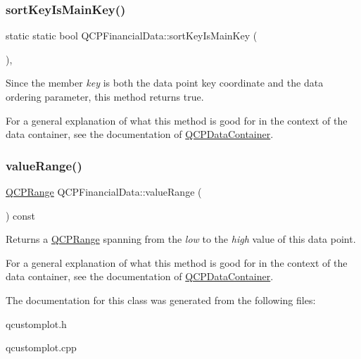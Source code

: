 \subsubsection{\texorpdfstring{sort\+Key\+Is\+Main\+Key()}{sortKeyIsMainKey()}}
{\footnotesize\ttfamily static static bool Q\+C\+P\+Financial\+Data\+::sort\+Key\+Is\+Main\+Key (\begin{DoxyParamCaption}{ }\end{DoxyParamCaption})\hspace{0.3cm}{\ttfamily [inline]}, {\ttfamily [static]}}

Since the member {\itshape key} is both the data point key coordinate and the data ordering parameter, this method returns true.

For a general explanation of what this method is good for in the context of the data container, see the documentation of \hyperlink{classQCPDataContainer}{Q\+C\+P\+Data\+Container}. \mbox{\label{classQCPFinancialData_a164d5584eeeb9ba48b4b595ac2ac7fcf}} 
\subsubsection{\texorpdfstring{value\+Range()}{valueRange()}}
{\footnotesize\ttfamily \hyperlink{classQCPRange}{Q\+C\+P\+Range} Q\+C\+P\+Financial\+Data\+::value\+Range (\begin{DoxyParamCaption}{ }\end{DoxyParamCaption}) const\hspace{0.3cm}{\ttfamily [inline]}}

Returns a \hyperlink{classQCPRange}{Q\+C\+P\+Range} spanning from the {\itshape low} to the {\itshape high} value of this data point.

For a general explanation of what this method is good for in the context of the data container, see the documentation of \hyperlink{classQCPDataContainer}{Q\+C\+P\+Data\+Container}. 

The documentation for this class was generated from the following files\+:\begin{DoxyCompactItemize}
\item 
qcustomplot.\+h\item 
qcustomplot.\+cpp\end{DoxyCompactItemize}
